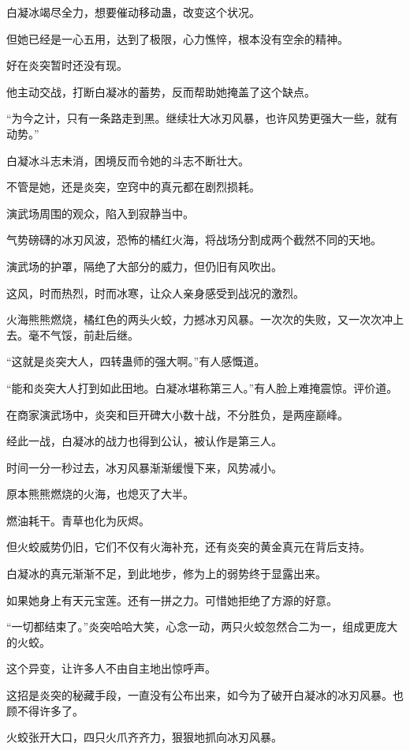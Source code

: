 \begin{this_body}
白凝冰竭尽全力，想要催动移动蛊，改变这个状况。

但她已经是一心五用，达到了极限，心力憔悴，根本没有空余的精神。

好在炎突暂时还没有现。

他主动交战，打断白凝冰的蓄势，反而帮助她掩盖了这个缺点。

“为今之计，只有一条路走到黑。继续壮大冰刃风暴，也许风势更强大一些，就有动势。”

白凝冰斗志未消，困境反而令她的斗志不断壮大。

不管是她，还是炎突，空窍中的真元都在剧烈损耗。

演武场周围的观众，陷入到寂静当中。

气势磅礴的冰刃风波，恐怖的橘红火海，将战场分割成两个截然不同的天地。

演武场的护罩，隔绝了大部分的威力，但仍旧有风吹出。

这风，时而热烈，时而冰寒，让众人亲身感受到战况的激烈。

火海熊熊燃烧，橘红色的两头火蛟，力撼冰刃风暴。一次次的失败，又一次次冲上去。毫不气馁，前赴后继。

“这就是炎突大人，四转蛊师的强大啊。”有人感慨道。

“能和炎突大人打到如此田地。白凝冰堪称第三人。”有人脸上难掩震惊。评价道。

在商家演武场中，炎突和巨开碑大小数十战，不分胜负，是两座巅峰。

经此一战，白凝冰的战力也得到公认，被认作是第三人。

时间一分一秒过去，冰刃风暴渐渐缓慢下来，风势减小。

原本熊熊燃烧的火海，也熄灭了大半。

燃油耗干。青草也化为灰烬。

但火蛟威势仍旧，它们不仅有火海补充，还有炎突的黄金真元在背后支持。

白凝冰的真元渐渐不足，到此地步，修为上的弱势终于显露出来。

如果她身上有天元宝莲。还有一拼之力。可惜她拒绝了方源的好意。

“一切都结束了。”炎突哈哈大笑，心念一动，两只火蛟忽然合二为一，组成更庞大的火蛟。

这个异变，让许多人不由自主地出惊呼声。

这招是炎突的秘藏手段，一直没有公布出来，如今为了破开白凝冰的冰刃风暴。也顾不得许多了。

火蛟张开大口，四只火爪齐齐力，狠狠地抓向冰刃风暴。


\end{this_body}
